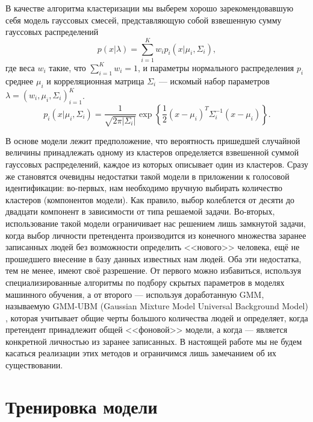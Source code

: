 \documentclass{gost-7-32}
\begin{document}
В качестве алгоритма кластеризации мы выберем хорошо зарекомендовавшую себя \cite{hindi_gmm} модель гауссовых смесей, представляющую собой взвешенную сумму гауссовых распределений
\begin{equation}
    p(x | \lambda) = \sum_{i = 1}^K w_i p_i(x | \mu_i, \Sigma_i),
\end{equation}
где веса $w_i$ такие, что $\sum_{i = 1}^K w_i = 1$, и параметры нормального распределения $p_i$ среднее $\mu_i$ и корреляционная матрица $\Sigma_i$ --- искомый набор параметров $\lambda = (w_i, \mu_i, \Sigma_i)_{i = 1}^K$.
\begin{equation}
    p_i(x | \mu_i, \Sigma_i) = \frac{1}{\sqrt{2 \pi |\Sigma_i|}} \exp \left\{ \frac{1}{2} (x - \mu_i)^T \Sigma_i^{-1} (x - \mu_i) \right\}.
\end{equation}

В основе модели лежит предположение, что вероятность пришедшей случайной величины принадлежать одному из кластеров определяется взвешенной суммой гауссовых распределений, каждое из которых описывает один из кластеров.
Сразу же становятся очевидны недостатки такой модели в приложении к голосовой идентификации: во-первых, нам необходимо вручную выбирать количество кластеров (компонентов модели).
Как правило, выбор колеблется от десяти до двадцати компонент в зависимости от типа решаемой задачи.
Во-вторых, использование такой модели ограничивает нас решением лишь замкнутой задачи, когда выбор личности претендента производится из конечного множества заранее записанных людей без возможности определить <<нового>> человека, ещё не прошедшего внесение в базу данных известных нам людей.
Оба эти недостатка, тем не менее, имеют своё разрешение.
От первого можно избавиться, используя специализированные алгоритмы по подбору скрытых параметров в моделях машинного обучения, а от второго --- используя доработанную GMM, называемую GMM-UBM (Gaussian Mixture Model Universal Background Model) \cite{gmm_ubm_smartphone, gmm_ubm_hindi, forensic_gmm_ubm_mfcc}, которая учитывает общие черты большого количества людей и определяет, когда претендент принадлежит общей <<фоновой>> модели, а когда --- является конкретной личностью из заранее записанных.
В настоящей работе мы не будем касаться реализации этих методов и ограничимся лишь замечанием об их существовании.

\section{Тренировка модели}
\end{document}
